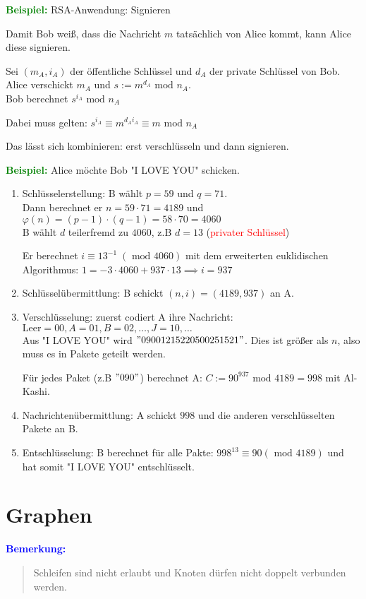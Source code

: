 \documentclass{article}
\newcommand{\red}[1]{\textcolor{red}{#1}}
\newcommand{\blue}[1]{\textcolor{blue}{#1}}
\newcommand{\green}[1]{\textcolor{green}{#1}}
\newcommand{\ex}{\green{\textbf{Beispiel: }}}
\newcommand{\an}[1]{\blue{\textbf{Bemerkung: }}\begin{quote}#1\end{quote}}
\renewcommand{\mod}{\text{ mod }}
\begin{document}
\ex RSA-Anwendung: Signieren

Damit Bob weiß, dass die Nachricht $m$ tatsächlich von Alice kommt, kann Alice diese signieren.

Sei $(m_A, i_A)$ der öffentliche Schlüssel und $d_A$ der private Schlüssel von Bob.\\
Alice verschickt $m_A$ und $s := m^{d_A} \mod n_A$.\\
Bob berechnet $s^{i_A} \mod n_A$

Dabei muss gelten: $s^{i_A} \equiv m^{d_Ai_A} \equiv m \mod n_A$

Das lässt sich kombinieren: erst verschlüsseln und dann signieren.

\ex Alice möchte Bob "I LOVE YOU" schicken.
\begin{enumerate}
    \item Schlüsselerstellung: B wählt $p = 59$ und $q = 71$.\\
    Dann berechnet er $n = 59 \cdot 71 = 4189$ und $\varphi(n) = (p-1) \cdot (q-1) = 58 \cdot 70 = 4060$\\
    B wählt $d$ teilerfremd zu $4060$, z.B $d = 13$ (\red{privater Schlüssel})

    Er berechnet $i \equiv 13^{-1} \; (\mod 4060)$ mit dem erweiterten euklidischen Algorithmus: $1 = -3 \cdot 4060 + 937 \cdot 13 \implies i = 937$
    \item Schlüsselübermittlung: B schickt $(n,i) = (4189,937)$ an A.
    \item Verschlüsselung: zuerst codiert A ihre Nachricht: $\text{Leer} = 00, A = 01, B = 02, \dots, J = 10, \dots$\\
    Aus "I LOVE YOU" wird $"090 012 152 205 002 515 21"$. Dies ist größer als $n$, also muss es in Pakete geteilt werden.

    Für jedes Paket (z.B $"090"$) berechnet A: $C := 90^{937} \mod 4189 = 998$ mit Al-Kashi.
    \item Nachrichtenübermittlung: A schickt $998$ und die anderen verschlüsselten Pakete an B.
    \item Entschlüsselung: B berechnet für alle Pakte: $998^13 \equiv 90 (\mod 4189)$ und hat somit "I LOVE YOU" entschlüsselt.
\end{enumerate}

\newpage
\section{Graphen}

\an{
    Schleifen sind nicht erlaubt und Knoten dürfen nicht doppelt verbunden werden.
}
\end{document}
